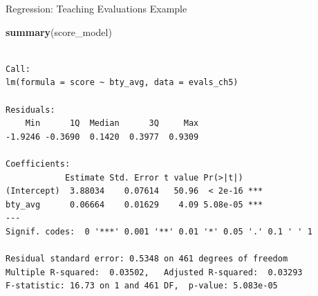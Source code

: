 \documentclass[
  ignorenonframetext,
]{beamer}
\newenvironment{Shaded}{\begin{snugshade}}{\end{snugshade}}
\newcommand{\FunctionTok}[1]{\textcolor[rgb]{0.13,0.29,0.53}{\textbf{#1}}}
\newcommand{\NormalTok}[1]{#1}
\begin{document}
\begin{frame}[fragile]{Regression: Teaching Evaluations Example}
\protect{}\label{regression-teaching-evaluations-example-8}
\small

\begin{Shaded}
\begin{Highlighting}[]
\FunctionTok{summary}\NormalTok{(score\_model)}
\end{Highlighting}
\end{Shaded}

\begin{verbatim}

Call:
lm(formula = score ~ bty_avg, data = evals_ch5)

Residuals:
    Min      1Q  Median      3Q     Max 
-1.9246 -0.3690  0.1420  0.3977  0.9309 

Coefficients:
            Estimate Std. Error t value Pr(>|t|)    
(Intercept)  3.88034    0.07614   50.96  < 2e-16 ***
bty_avg      0.06664    0.01629    4.09 5.08e-05 ***
---
Signif. codes:  0 '***' 0.001 '**' 0.01 '*' 0.05 '.' 0.1 ' ' 1

Residual standard error: 0.5348 on 461 degrees of freedom
Multiple R-squared:  0.03502,   Adjusted R-squared:  0.03293 
F-statistic: 16.73 on 1 and 461 DF,  p-value: 5.083e-05
\end{verbatim}

\normalsize
\end{frame}
\end{document}
